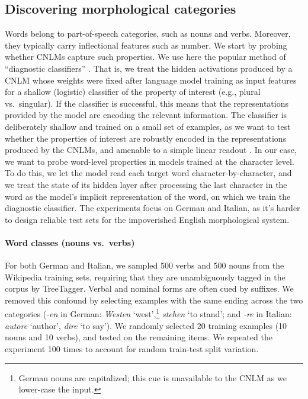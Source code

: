 \subsection{Discovering morphological categories}
\label{sec:categories}

Words belong to part-of-speech categories, such as nouns and
verbs. Moreover, they typically carry inflectional features such as
number. We start by probing whether CNLMs capture such
properties. We use here the popular method of ``diagnostic
classifiers'' \cite{Hupkes:etal:2017}. That is, we treat the hidden
activations produced by a CNLM whose weights were fixed after language
model training as input features for a shallow (logistic) classifier
of the property of interest (e.g., plural vs.~singular). If the
classifier is successful, this means that the representations provided
by the model are encoding the relevant information.  The classifier is
deliberately shallow and trained on a small set of examples, as we
want to test whether the properties of interest are robustly encoded
in the representations produced by the CNLMs, and amenable to a simple
linear readout \cite{Fusi:etal:2016}. In our case, we want to probe
word-level properties in models trained at the character level. To do
this, we let the model read each target word character-by-character,
and we treat the state of its hidden layer after processing the last
character in the word as the model's implicit representation of the
word, on which we train the diagnostic classifier. %
The experiments focus on German and Italian, as it's harder to design
reliable test sets for the impoverished English morphological system.

\paragraph{Word classes (nouns vs.~verbs)}

For both German and Italian, we sampled 500 verbs and 500 nouns from
the Wikipedia training sets, requiring that they are unambiguously
tagged in the corpus by TreeTagger. Verbal and nominal forms are often
cued by suffixes. We removed this confound by selecting examples with
the same ending across the two categories (\emph{-en} in German:
\emph{Westen} `west',\footnote{German nouns are capitalized; this cue
  is unavailable to the CNLM as we lower-case the input.} %
\emph{stehen} `to stand'; and \emph{-re} in Italian: \emph{autore}
`author', \emph{dire} `to say'). We randomly selected 20 training examples
(10 nouns and 10 verbs), and tested on the remaining items.  We
repeated the experiment 100 times to account for random train-test
split variation.

